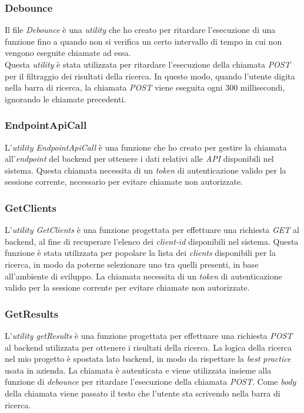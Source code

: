 \subsubsection{Debounce}\label{subsubsec:debounce}
Il file \textit{Debounce} è una \textit{utility} che ho creato per ritardare l'esecuzione di una funzione fino a quando non si verifica
un certo intervallo di tempo in cui non vengono eseguite chiamate ad essa.\\
Questa \textit{utility} è stata utilizzata per ritardare l'esecuzione della chiamata \textit{POST} per il filtraggio dei risultati della ricerca. 
In questo modo, quando l'utente digita nella barra di ricerca, la chiamata \textit{POST} viene eseguita ogni 300 millisecondi, ignorando le chiamate precedenti.

\subsubsection{EndpointApiCall}\label{subsubsec:endpoint-api-call}
L'\textit{utility EndpointApiCall} è una funzione che ho creato per gestire la chiamata all'\textit{endpoint} del backend per ottenere
i dati relativi alle \textit{API} disponibili nel sistema.
Questa chiamata necessita di un \textit{token} di autenticazione valido per la sessione corrente, necessario per evitare chiamate non autorizzate.

\subsubsection{GetClients}\label{subsubsec:get-clients}
L'\textit{utility GetClients} è una funzione progettata per effettuare una richiesta \textit{GET} al backend, al fine di recuperare 
l'elenco dei \textit{client-id} disponibili nel sistema. Questa funzione è stata utilizzata per popolare la lista dei \textit{clients} disponibili
per la ricerca, in modo da poterne selezionare uno tra quelli presenti, in base all'ambiente di sviluppo.
La chiamata necessita di un \textit{token} di autenticazione valido per la sessione corrente per evitare chiamate non autorizzate.

\subsubsection{GetResults}\label{subsubsec:get-results}
L'\textit{utility getResults} è una funzione progettata per effettuare una richiesta \textit{POST} al backend utilizzata per ottenere i risultati della ricerca. 
La logica della ricerca nel mio progetto è spostata lato backend, in modo da rispettare la \textit{best practice} usata in azienda.
La chiamata è autenticata e viene utilizzata insieme alla funzione di \textit{debounce} per ritardare l'esecuzione della chiamata \textit{POST}. Come \textit{body} della chiamata
viene passato il testo che l'utente sta scrivendo nella barra di ricerca.

